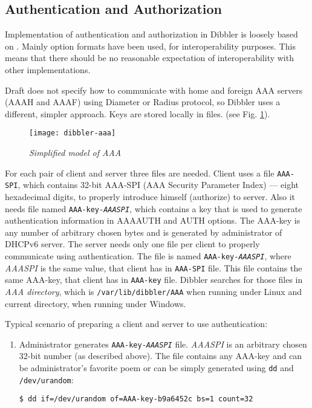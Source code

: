 \begin{enumerate}
\subsection{Authentication and Authorization}
\label{feature-auth}

Implementation of authentication and authorization in Dibbler is
loosely based on \cite{draft-aaa}. Mainly option formats have been
used, for interoperability purposes. This means that there should be
no reasonable expectation of interoperability with other
implementations.

Draft does not specify how to communicate with home and foreign AAA
servers (AAAH and AAAF) using Diameter or Radius protocol, so Dibbler
uses a different, simpler approach. Keys are stored locally in
files. (see Fig. \ref{fig-aaa}).

\begin{figure}[ht]
\begin{center}
\label{fig-aaa}
\texttt{[image: dibbler-aaa]}
\caption{\emph{Simplified model of AAA}}
\end{center}
\end{figure}

For each pair of client and server three files are needed. Client uses
a file \texttt{AAA-SPI}, which contains 32-bit AAA-SPI (AAA Security
Parameter Index) --- eight hexadecimal digits, to properly introduce
himself (authorize) to server. Also it needs file named
\texttt{AAA-key-\textit{AAASPI}}, which contains a key that is used to
generate authentication information in AAAAUTH and AUTH options. The
AAA-key is any number of arbitrary chosen bytes and is generated by
administrator of DHCPv6 server. The server needs only one file per
client to properly communicate using authentication. The file is named
\texttt{AAA-key-\textit{AAASPI}}, where \textit{AAASPI} is the same
value, that client has in \texttt{AAA-SPI} file. This file contains
the same AAA-key, that client has in \texttt{AAA-key} file. Dibbler
searches for those files in \textit{AAA directory}, which is
\texttt{/var/lib/dibbler/AAA} when running under Linux and current
directory, when running under Windows.

Typical scenario of preparing a client and server to use authentication:
\begin{enumerate}
 \item Administrator generates \texttt{AAA-key-\textit{AAASPI}}
   file. \textit{AAASPI} is an arbitrary chosen 32-bit number (as
   described above). The file contains any AAA-key and can be
   administrator's favorite poem or can be simply generated using
   \texttt{dd} and \texttt{/dev/urandom}:
\begin{lstlisting}
$ dd if=/dev/urandom of=AAA-key-b9a6452c bs=1 count=32
\end{lstlisting}


\end{enumerate}
\end{enumerate}
